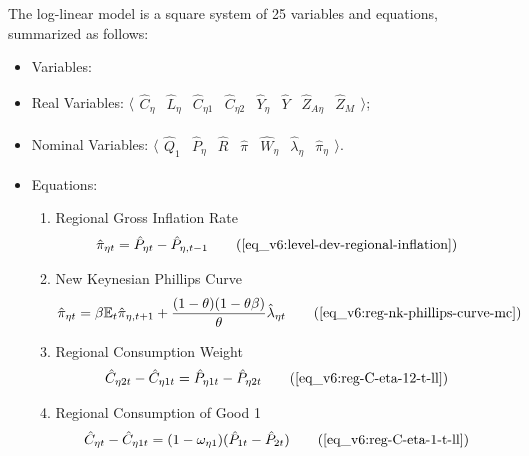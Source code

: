 \documentclass[../thesis.tex]{subfiles}
\begin{document}
The log-linear model is a square system of 25 variables and equations, summarized as follows:

{\singlespacing

\begin{itemize}
	
	\item Variables:
	
	\item Real Variables: $\langle \begin{matrix} \hat{C}_{\eta } & \hat{L}_{\eta } & \hat{C}_{\eta 1} & \hat{C}_{\eta 2} & \hat{Y}_{\eta } & \hat{Y}_{} & \hat{Z}_{A\eta } & \hat{Z}_{M} \end{matrix} \rangle$;
	
	\item Nominal Variables: $\langle \begin{matrix} \hat{Q}_{1} & \hat{P}_{\eta } & \hat{R}_{} & \hat{\pi}_{} & \hat{W}_{\eta } & \hat{\lambda}_{\eta } & \hat{\pi}_{\eta } \end{matrix} \rangle$.
	
	\item Equations:
	
	\begin{enumerate}
		
		\item Regional Gross Inflation Rate
		\begin{align}
			\hat{\pi}_{\eta t} &= \hat{P}_{\eta t} - \hat{P}_{\eta, t-1} \tag{\ref{eq_v6:level-dev-regional-inflation}}
		\end{align}
		
		\item New Keynesian Phillips Curve
		\begin{align}
			\hat{\pi}_{\eta t} &= \beta \E \hat{\pi}_{\eta, t+1} + \frac{(1-\theta) (1- \theta \beta)}{\theta} \hat{\lambda}_{\eta t} \tag{\ref{eq_v6:reg-nk-phillips-curve-mc}}
		\end{align}
		
		\item Regional Consumption Weight
		\begin{align}
			\hat{C}_{\eta 2t} - \hat{C}_{\eta 1t} &= \hat{P}_{\eta 1t} - \hat{P}_{\eta 2t} \tag{\ref{eq_v6:reg-C-eta-12-t-ll}}
		\end{align}
		
		\item Regional Consumption of Good 1
		\begin{align}
			\hat{C}_{\eta t} - \hat{C}_{\eta 1 t} &= (1 - \omega_{\eta 1}) (\hat{P}_{1t} - \hat{P}_{2t}) \tag{\ref{eq_v6:reg-C-eta-1-t-ll}}
		\end{align}
		

\end{enumerate}
\end{itemize}}
\end{document}
